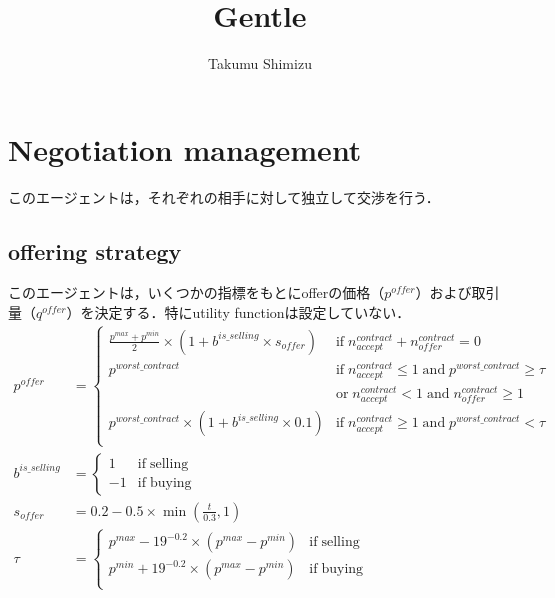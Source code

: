 \documentclass[uplatex, 10pt, a4j]{jsarticle}
\begin{document}
\title{Gentle}
\author{Takumu Shimizu}
\date{}
\maketitle

\section{Negotiation management}
このエージェントは，それぞれの相手に対して独立して交渉を行う．
\subsection{offering strategy}
このエージェントは，いくつかの指標をもとにofferの価格（$p^{offer}$）および取引量（$q^{offer}$）を決定する．特にutility functionは設定していない．
\begin{equation*}
    \begin{split}
        p^{offer}&=\left\{\begin{array}{ll}
            \frac{p^{max}+p^{min}}{2} \times \left(1+b^{is\_selling}\times s_{offer}\right) & \mathrm{if} \; n^{contract}_{accept}+n^{contract}_{offer}=0                                  \\ [3mm]
            p^{worst\_contract}                                                             & \mathrm{if} \; n^{contract}_{accept} \leq 1 \; \mathrm{and} \; p^{worst\_contract} \geq \tau \\ [1mm]
                                                                                            & \mathrm{or} \; n^{contract}_{accept}<1 \; \mathrm{and} \; n^{contract}_{offer} \geq 1        \\ [3mm]
            p^{worst\_contract} \times \left(1 + b^{is\_selling} \times 0.1\right)          & \mathrm{if} \; n^{contract}_{accept} \geq 1 \; \mathrm{and} \; p^{worst\_contract} < \tau    \\
        \end{array}\right. \\
        b^{is\_selling}&=\left\{\begin{array}{ll}
            1  & \mathrm{if \; selling} \\
            -1 & \mathrm{if \; buying}
        \end{array}\right. \\
        s_{offer} &= 0.2-0.5 \times \min{\left(\frac{t}{0.3}, 1\right)} \\
        \tau &= \left\{\begin{array}{ll}
            p^{max} - 19^{-0.2} \times \left(p^{max} - p^{min}\right) & \mathrm{if \; selling} \\
            p^{min} + 19^{-0.2} \times \left(p^{max} - p^{min}\right) & \mathrm{if \; buying}  \\
        \end{array}\right. \\
    \end{split}
\end{equation*}
\end{document}
